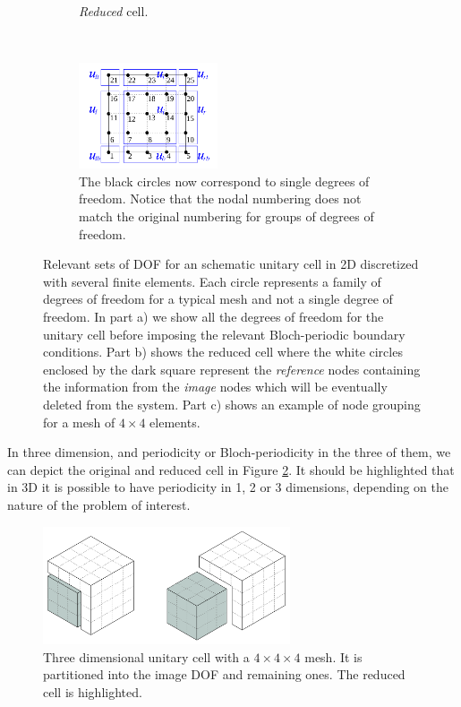 \begin{figure}[h]
\begin{subfigure}[b]{0.3\textwidth}
		\caption{\emph{Reduced} cell.}
	\end{subfigure}\\
%
	\begin{subfigure}[b]{0.7\textwidth}\qquad
		\centering
		\includegraphics[width=0.45\textwidth]{cell_FEM-nodes.pdf}
		\caption{The black circles now correspond to single degrees of freedom. Notice that the nodal numbering does not match the original numbering for groups of degrees of freedom.}
	\end{subfigure}
\caption{Relevant sets of DOF for an schematic unitary cell in 2D discretized with several finite elements. Each circle represents a family of degrees of freedom for a typical mesh and not a single degree of freedom. In part a) we show all the degrees of freedom for the unitary cell before imposing the relevant Bloch-periodic boundary conditions. Part b) shows the reduced cell where the white circles enclosed by the dark square represent the \emph{reference} nodes containing the information from the \emph{image} nodes which will be eventually deleted from the system. Part c) shows an example of node grouping for a mesh of $4\times 4$ elements.}
\label{fig:bloch_FEM}
\end{figure}

In three dimension, and periodicity or Bloch-periodicity in the three of them, we can depict the original and reduced cell in Figure \ref{fig:bloch_3D_cell}. It should be highlighted that in 3D it is possible to have periodicity in 1, 2 or 3 dimensions, depending on the nature of the problem of interest.
\begin{figure}[h]
	\centering
	\includegraphics[width=0.65\textwidth]{Cube_Bloch_Schematic.pdf}
	\caption{Three dimensional unitary cell with a $4\times4\times4$ mesh. It is partitioned into the image DOF and remaining ones. The reduced cell is highlighted.}
	\label{fig:bloch_3D_cell}
\end{figure}


